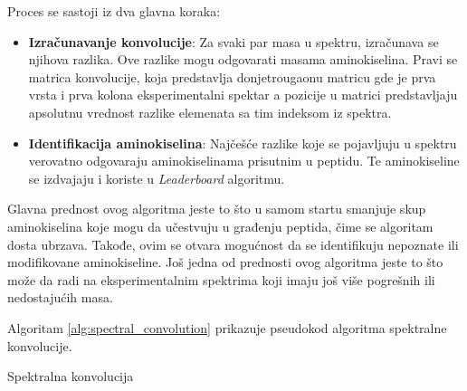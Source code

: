 \documentclass[12pt,oneside]{memoir}
\begin{document}
Proces se sastoji iz dva glavna koraka:

\begin{itemize}
    \item \textbf{Izračunavanje konvolucije}: Za svaki par masa u spektru, izračunava se njihova razlika. Ove razlike mogu odgovarati masama aminokiselina. Pravi se matrica konvolucije, koja predstavlja donjetrougaonu matricu gde je prva vrsta i prva kolona eksperimentalni spektar a pozicije u matrici predstavljaju apsolutnu vrednost razlike elemenata sa tim indeksom iz spektra.
    \item \textbf{Identifikacija aminokiselina}: Najčešće razlike koje se pojavljuju u spektru verovatno odgovaraju aminokiselinama prisutnim u peptidu. Te aminokiseline se izdvajaju i koriste u \emph{Leaderboard} algoritmu.
\end{itemize}

Glavna prednost ovog algoritma jeste to što u samom startu smanjuje skup aminokiselina koje mogu da učestvuju u građenju peptida, čime se algoritam dosta ubrzava. Takođe, ovim se otvara mogućnost da se identifikuju nepoznate ili modifikovane aminokiseline. Još jedna od prednosti ovog algoritma jeste to što može da radi na eksperimentalnim spektrima koji imaju još više pogrešnih ili nedostajućih masa.

Algoritam \ref{alg:spectral_convolution} prikazuje pseudokod algoritma spektralne konvolucije.

\begin{algorithm}[H]
\label{alg:spectral_convolution}
\caption{Spektralna konvolucija}
\SetAlgoLined
\DontPrintSemicolon
{}
\end{algorithm}
\end{document}
